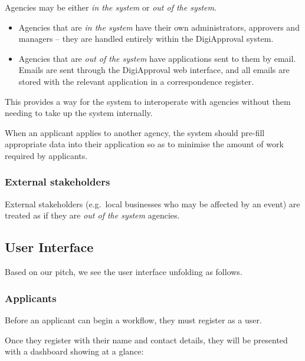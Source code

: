 \documentclass[12pt,a4paper,twosided]{article}
\begin{document}
Agencies may be either \emph{in the system} or \emph{out of the system}.

\begin{itemize}
\itemsep1pt\parskip0pt
\item
  Agencies that are \emph{in the system} have their own administrators,
  approvers and managers -- they are handled entirely within the
  DigiApproval system.
\item
  Agencies that are \emph{out of the system} have applications sent to
  them by email. Emails are sent through the DigiApproval web interface,
  and all emails are stored with the relevant application in a
  correspondence register.
\end{itemize}

This provides a way for the system to interoperate with agencies without
them needing to take up the system internally.

When an applicant applies to another agency, the system should pre-fill
appropriate data into their application so as to minimise the amount of
work required by applicants.

\subsubsection{External stakeholders}

External stakeholders (e.g.~local businesses who may be affected by an
event) are treated as if they are \emph{out of the system} agencies.

\subsection{User Interface}

Based on our pitch, we see the user interface unfolding as follows.

\subsubsection{Applicants}

Before an applicant can begin a workflow, they must register as a user.

Once they register with their name and contact details, they will be
presented with a dashboard showing at a glance:
\end{document}
